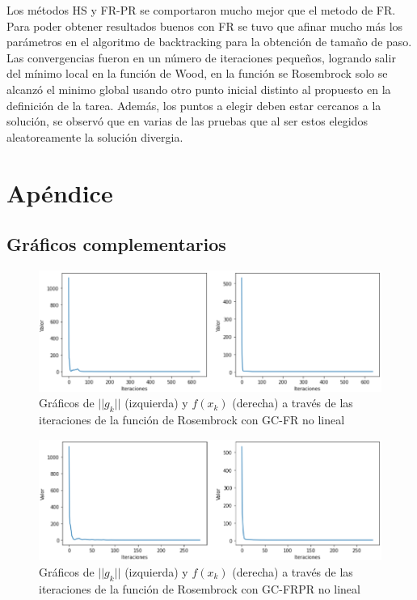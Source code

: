 \documentclass[conference]{IEEEtran}
\begin{document}
Los métodos HS y FR-PR se comportaron mucho mejor que el metodo de FR. Para poder obtener resultados
buenos con FR se tuvo que afinar mucho más los parámetros en el algoritmo de backtracking para la
obtención de tamaño de paso. Las convergencias fueron en un número de iteraciones pequeños, logrando
salir del mínimo local en la función de Wood, en la función se Rosembrock solo se alcanzó el minimo
global usando otro punto inicial distinto al propuesto en la definición de la tarea. Además, los
puntos a elegir deben estar cercanos a la solución, se observó que en varias de las pruebas que al
ser estos elegidos aleatoreamente la solución divergia.

\newpage

\section{Apéndice}


\subsection{Gráficos complementarios}

\begin{figure}[htbp]
    \centerline{\includegraphics[scale=0.27]{1.png}}
    \caption{Gráficos de $||g_k||$ (izquierda) y $f(x_k)$ (derecha) a través de las iteraciones de la función de Rosembrock con GC-FR no lineal}
    \label{r1}
\end{figure}

\begin{figure}[htbp]
    \centerline{\includegraphics[scale=0.27]{2.png}}
    \caption{Gráficos de $||g_k||$ (izquierda) y $f(x_k)$ (derecha) a través de las iteraciones de la función de Rosembrock con GC-FRPR no lineal}
    \label{r2}
\end{figure}
\end{document}
